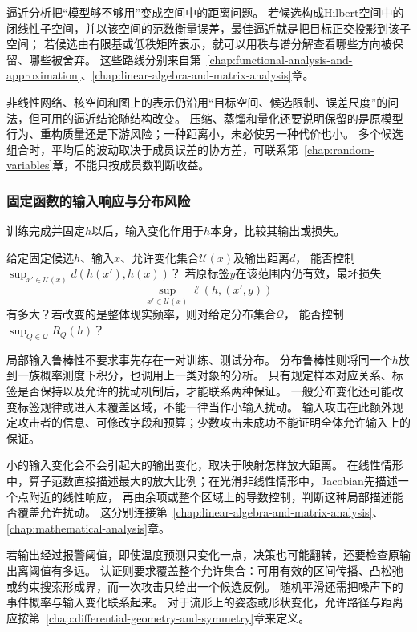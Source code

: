 逼近分析把“模型够不够用”变成空间中的距离问题。
若候选构成Hilbert空间中的闭线性子空间，并以该空间的范数衡量误差，最佳逼近就是把目标正交投影到该子空间；
若候选由有限基或低秩矩阵表示，就可以用秩与谱分解查看哪些方向被保留、哪些被舍弃。
这些路线分别来自第~\ref{chap:functional-analysis-and-approximation}、\ref{chap:linear-algebra-and-matrix-analysis}章。

非线性网络、核空间和图上的表示仍沿用“目标空间、候选限制、误差尺度”的问法，但可用的逼近结论随结构改变。
压缩、蒸馏和量化还要说明保留的是原模型行为、重构质量还是下游风险；一种距离小，未必使另一种代价也小。
多个候选组合时，平均后的波动取决于成员误差的协方差，可联系第~\ref{chap:random-variables}章，不能只按成员数判断收益。

\subsubsection{固定函数的输入响应与分布风险}
\label{sec:future-analysis-robustness}

训练完成并固定$h$以后，输入变化作用于$h$本身，比较其输出或损失。

\begin{mathproblem}[固定预测器的局部扰动与分布风险]
  \label{question:future-robustness}
  给定固定候选$h$、输入$x$、允许变化集合$\mathcal U(x)$及输出距离$d$，
  能否控制$\sup_{x'\in\mathcal U(x)}d(h(x'),h(x))$？
  若原标签$y$在该范围内仍有效，最坏损失
  \[
    \sup_{x'\in\mathcal U(x)}\ell(h,(x',y))
  \]
  有多大？若改变的是整体现实频率，则对给定分布集合$\mathcal Q$，
  能否控制$\sup_{Q\in\mathcal Q}R_Q(h)$？
\end{mathproblem}

局部输入鲁棒性不要求事先存在一对训练、测试分布。
分布鲁棒性则将同一个$h$放到一族概率测度下积分，也调用上一类对象的分析。
只有规定样本对应关系、标签是否保持以及允许的扰动机制后，才能联系两种保证。
一般分布变化还可能改变标签规律或进入未覆盖区域，不能一律当作小输入扰动。
输入攻击在此额外规定攻击者的信息、可修改字段和预算；少数攻击未成功不能证明全体允许输入上的保证。

小的输入变化会不会引起大的输出变化，取决于映射怎样放大距离。
在线性情形中，算子范数直接描述最大的放大比例；在光滑非线性情形中，Jacobian先描述一个点附近的线性响应，
再由余项或整个区域上的导数控制，判断这种局部描述能否覆盖允许扰动。
这分别连接第~\ref{chap:linear-algebra-and-matrix-analysis}、\ref{chap:mathematical-analysis}章。

若输出经过报警阈值，即使温度预测只变化一点，决策也可能翻转，还要检查原输出离阈值有多远。
认证则要求覆盖整个允许集合：可用有效的区间传播、凸松弛或约束搜索形成界，而一次攻击只给出一个候选反例。
随机平滑还需把噪声下的事件概率与输入变化联系起来。
对于流形上的姿态或形状变化，允许路径与距离应按第~\ref{chap:differential-geometry-and-symmetry}章来定义。

